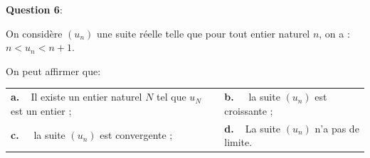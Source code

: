 \medskip

\textbf{Question 6}:

\medskip

On considère $\left(u_n\right)$ une suite réelle telle que pour tout entier naturel $n$, on a : $n < u_n < n + 1$. 

On peut affirmer que:

\begin{center}
\begin{tabularx}{\linewidth}{X X}
\textbf{a.~~}Il existe un entier naturel $N$ tel que $u_N$ est un entier ;&\textbf{b.~~} la suite $\left(u_n\right)$ est croissante ;\\
\textbf{c.~~} la suite $\left(u_n\right)$ est convergente ;&\textbf{d.~~}La suite $\left(u_n\right)$ n'a pas de limite.
\end{tabularx}
\end{center}



\bigskip
